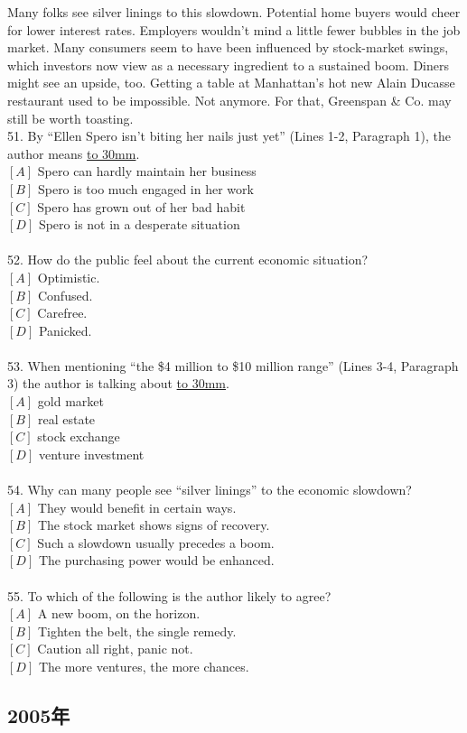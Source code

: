 \documentclass[a4paper]{article}
\begin{document}
\par
Many folks see silver linings to this slowdown. Potential home buyers would cheer for lower interest rates. Employers wouldn’t mind a little fewer bubbles in the job market. Many consumers seem to have been influenced by stock-market swings, which investors now view as a necessary ingredient to a sustained boom. Diners might see an upside, too. Getting a table at Manhattan’s hot new Alain Ducasse restaurant used to be impossible. Not anymore. For that, Greenspan \& Co. may still be worth toasting.
\\51.	By “Ellen Spero isn’t biting her nails just yet” (Lines 1-2, Paragraph 1), the author means \underline{\hbox to 30mm{}}.\\$[A]$ Spero can hardly maintain her business\\$[B]$ Spero is too much engaged in her work\\$[C]$ Spero has grown out of her bad habit\\$[D]$ Spero is not in a desperate situation\\\\52.	How do the public feel about the current economic situation?\\$[A]$ Optimistic.\\$[B]$ Confused.\\$[C]$ Carefree.\\$[D]$ Panicked.\\\\53.	When mentioning “the \$4 million to \$10 million range” (Lines 3-4, Paragraph 3) the author is talking about \underline{\hbox to 30mm{}}.\\$[A]$ gold market\\$[B]$ real estate\\$[C]$ stock exchange\\$[D]$ venture investment\\\\54.	Why can many people see “silver linings” to the economic slowdown?\\$[A]$ They would benefit in certain ways.\\$[B]$ The stock market shows signs of recovery.\\$[C]$ Such a slowdown usually precedes a boom.\\$[D]$ The purchasing power would be enhanced.\\\\55.	To which of the following is the author likely to agree?\\$[A]$ A new boom, on the horizon.\\$[B]$ Tighten the belt, the single remedy.\\$[C]$ Caution all right, panic not.\\$[D]$ The more ventures, the more chances.\\\subsection{2005年}
\end{document}
